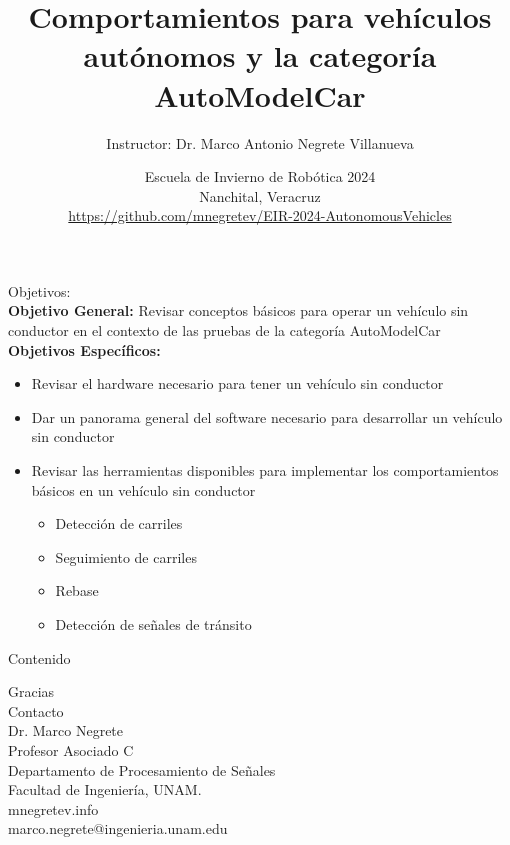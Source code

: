 \documentclass[10pt,spanish,aspectratio=1610]{beamer}
\begin{document}
\renewcommand{\tablename}{Tabla}
\renewcommand{\figurename}{Figura}

\title[Vehículos autónomos y la liga AutoModelCar]{Comportamientos para vehículos autónomos y la categoría AutoModelCar}
\author[Marco Negrete]{Instructor: Dr. Marco Antonio Negrete Villanueva}
\date[EIR 2024]{Escuela de Invierno de Robótica 2024\\Nanchital, Veracruz\\\url{https://github.com/mnegretev/EIR-2024-AutonomousVehicles}}

\begin{frame}
\titlepage
\end{frame}

\begin{frame}
  \Large{Objetivos:}
  \normalsize
  \[\]
  \textbf{Objetivo General:} Revisar conceptos básicos para operar un vehículo sin conductor en el contexto de las pruebas de la categoría AutoModelCar
  \\
  \textbf{Objetivos Específicos:}
  \begin{itemize}
  \item Revisar el hardware necesario para tener un vehículo sin conductor
  \item Dar un panorama general del software necesario para desarrollar un vehículo sin conductor
  \item Revisar las herramientas disponibles para implementar los comportamientos básicos en un vehículo sin conductor
    \begin{itemize}
    \item Detección de carriles
    \item Seguimiento de carriles
    \item Rebase
    \item Detección de señales de tránsito
    \end{itemize}
  \end{itemize}
\end{frame}

\begin{frame}
  \Large{Contenido}
  \normalsize
  \[\]

  \tableofcontents
\end{frame}






% 
% 
% 
% 
% 


\begin{frame}
  \Huge{Gracias}
  \[\]
  \Large{Contacto}
  \[\]
  \large
  Dr. Marco Negrete\\
  Profesor Asociado C\\
  Departamento de Procesamiento de Señales\\
  Facultad de Ingeniería, UNAM.
\[\]
mnegretev.info\\
marco.negrete@ingenieria.unam.edu\\
\end{frame}
\end{document}

